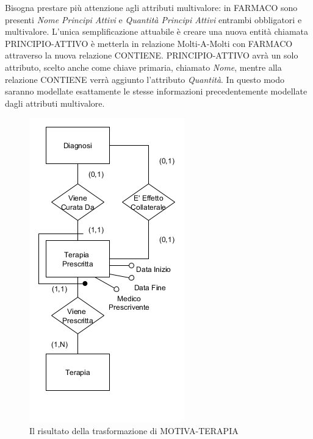 \documentclass{article}
\begin{document}
Bisogna prestare più attenzione agli attributi multivalore:
in FARMACO sono presenti \textit{Nome Principi Attivi} e \textit{Quantità Principi Attivi} entrambi obbligatori e multivalore.
L'unica semplificazione attuabile è creare una nuova entità chiamata PRINCIPIO-ATTIVO è metterla in relazione Molti-A-Molti con FARMACO attraverso la nuova relazione CONTIENE.
PRINCIPIO-ATTIVO avrà un solo attributo, scelto anche come chiave primaria, chiamato \textit{Nome}, mentre alla relazione CONTIENE verrà aggiunto l'attributo \textit{Quantità}.
In questo modo saranno modellate esattamente le stesse informazioni precedentemente modellate dagli attributi multivalore.

\begin{figure}[!ht] %
  \centering
  \includegraphics[width=.4\linewidth]{piccolo3}
  \caption{Il risultato della trasformazione di MOTIVA-TERAPIA}
  \label{fig:piccolo3}
\end{figure}
\end{document}

